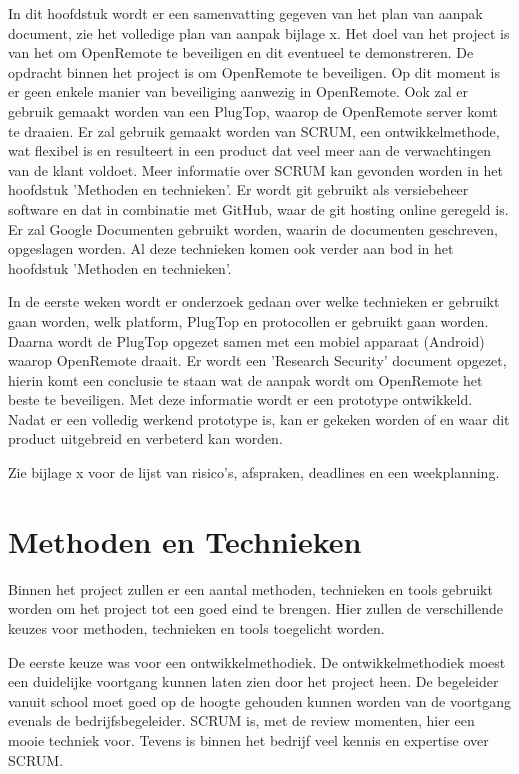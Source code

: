 \documentclass{article}
\begin{document}
In dit hoofdstuk wordt er een samenvatting gegeven van het plan  van  aanpak
document, zie het volledige plan van aanpak bijlage  x.  Het  doel  van  het
project is  van  het  om  OpenRemote  te  beveiligen  en  dit  eventueel  te
demonstreren.  De  opdracht  binnen  het  project  is   om   OpenRemote   te
beveiligen. Op dit moment is er geen enkele manier van beveiliging  aanwezig
in OpenRemote. Ook zal er gebruik gemaakt worden van een PlugTop, waarop  de
OpenRemote server komt te draaien. Er zal gebruik gemaakt worden van  SCRUM,
een ontwikkelmethode, wat flexibel is en resulteert in een product dat  veel
meer aan de verwachtingen van de klant voldoet. Meer informatie  over  SCRUM
kan gevonden worden in het hoofdstuk 'Methoden en technieken'.
Er wordt git gebruikt als versiebeheer software en  dat  in  combinatie  met
GitHub, waar de git hosting online geregeld is.  Er  zal  Google  Documenten
gebruikt worden, waarin de documenten geschreven, opgeslagen worden.
Al deze technieken komen ook verder aan bod in het  hoofdstuk  'Methoden  en
technieken'.

In de eerste weken wordt  er  onderzoek  gedaan  over  welke  technieken  er
gebruikt gaan worden, welk platform,  PlugTop  en  protocollen  er  gebruikt
gaan worden. Daarna wordt de PlugTop opgezet samen met een  mobiel  apparaat
(Android)  waarop  OpenRemote  draait.  Er  wordt  een  'Research  Security'
document opgezet, hierin komt een conclusie te staan wat de aanpak wordt  om
OpenRemote het beste  te  beveiligen.  Met  deze  informatie  wordt  er  een
prototype ontwikkeld. Nadat er een volledig werkend  prototype  is,  kan  er
gekeken worden of en waar dit product uitgebreid en verbeterd kan worden.

Zie bijlage x voor de  lijst  van  risico's,  afspraken,  deadlines  en  een
weekplanning.

\newpage
\section{Methoden en Technieken}

Binnen het project zullen er een aantal methoden, technieken en tools
gebruikt worden om het project tot een goed eind te brengen. Hier zullen de
verschillende keuzes voor methoden, technieken en tools toegelicht worden.

De eerste keuze was voor een ontwikkelmethodiek. De ontwikkelmethodiek
moest een duidelijke voortgang kunnen laten zien door het project heen. De
begeleider vanuit school moet goed op de hoogte gehouden kunnen worden van
de voortgang evenals de bedrijfsbegeleider. SCRUM is, met de review
momenten, hier een mooie techniek voor. Tevens is binnen het bedrijf veel
kennis en expertise over SCRUM.
\end{document}
